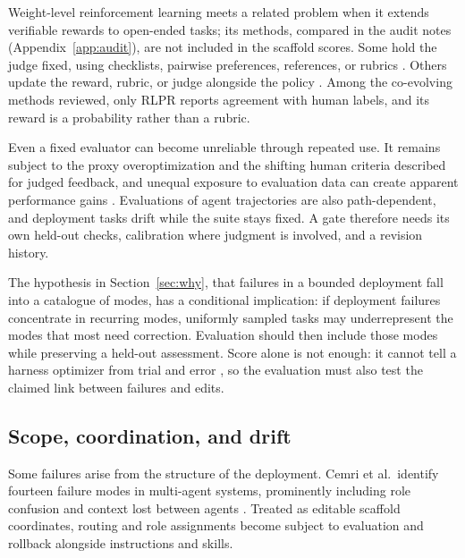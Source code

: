 \documentclass[
  11pt,
]{article}
\begin{document}
Weight-level reinforcement learning meets a related problem when it extends verifiable rewards to open-ended tasks; its methods, compared in the audit notes (Appendix~\ref{app:audit}), are not included in the scaffold scores. Some hold the judge fixed, using checklists, pairwise preferences, references, or rubrics \cite{gunjal2025rubrics, jia2025writingzero, shi2026references, jin2026rlaes}. Others update the reward, rubric, or judge alongside the policy \cite{yu2025rlpr, xu2026rubricarm, ding2026evorubrics, zhu2026score, li2026rubricem}. Among the co-evolving methods reviewed, only RLPR reports agreement with human labels, and its reward is a probability rather than a rubric.

Even a fixed evaluator can become unreliable through repeated use. It remains subject to the proxy overoptimization \cite{gao2023overoptimization} and the shifting human criteria \cite{shankar2024validators} described for judged feedback, and unequal exposure to evaluation data can create apparent performance gains \cite{singh2025leaderboard}. Evaluations of agent trajectories are also path-dependent, and deployment tasks drift while the suite stays fixed. A gate therefore needs its own held-out checks, calibration where judgment is involved, and a revision history.

The hypothesis in Section~\ref{sec:why}, that failures in a bounded deployment fall into a catalogue of modes, has a conditional implication: if deployment failures concentrate in recurring modes, uniformly sampled tasks may underrepresent the modes that most need correction. Evaluation should then include those modes while preserving a held-out assessment. Score alone is not enough: it cannot tell a harness optimizer from trial and error \cite{ong2026harnesseval}, so the evaluation must also test the claimed link between failures and edits.

\subsection{Scope, coordination, and drift}\label{scope-coordination-and-drift}

Some failures arise from the structure of the deployment. Cemri et al.~identify fourteen failure modes in multi-agent systems, prominently including role confusion and context lost between agents \cite{cemri2025mast}. Treated as editable scaffold coordinates, routing and role assignments become subject to evaluation and rollback alongside instructions and skills.
\end{document}
